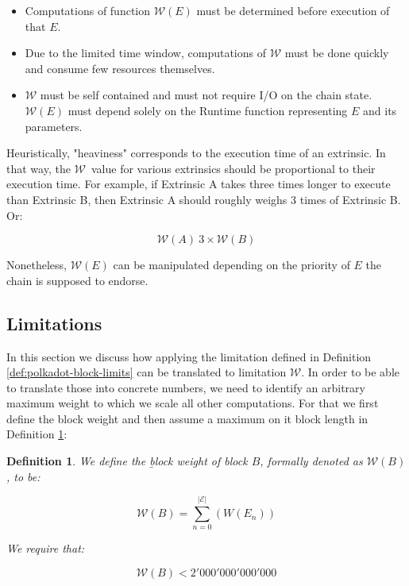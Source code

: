 \documentclass[11pt,a4paper]{article}
\newtheorem{definition}{Definition}
\newcommand{\TWF}{\ensuremath{\mathcal{W}}}
\begin{document}
\begin{itemize}

\item Computations of function $\mathcal{W}(E)$  must be determined before
execution of that $E$.

\item Due to the limited time window, computations of $\TWF$ must be done
      quickly and consume few resources themselves.
\item $\TWF$ must be self contained and must not require I/O on the chain state.
$\TWF(E)$ must depend solely on the Runtime function representing $E$ and its
parameters.

\end{itemize}

Heuristically, "heaviness" corresponds to the execution time of an extrinsic. In
that way, the \TWF\ value for various extrinsics should be proportional to their
execution time. For example, if Extrinsic A takes three times longer to execute
than Extrinsic B, then Extrinsic A should roughly weighs 3 times of Extrinsic B.
Or:

\[
\TWF(A)~3\times \TWF(B)
\]

Nonetheless, $\TWF(E)$ can be manipulated depending on the priority of $E$ the
chain is supposed to endorse.

\subsection{Limitations}\label{sec:limitations}

In this section we discuss how applying the limitation defined in Definition
\ref{def:polkadot-block-limits} can be translated to limitation $\TWF$. In order
to be able to translate those into concrete numbers, we need to identify an
arbitrary maximum weight to which we scale all other computations. For that we
first define the block weight and then assume a maximum on it block length in
Definition \ref{def:block-weight}:

\begin{definition}
  \label{def:block-weight} We define the {\b block weight} of block $B$,
  formally denoted as  $\TWF(B)$, to be:

  \[
    \TWF(B) = \sum^{|\mathcal{E}|}_{n = 0} (W(E_n))
  \]

  We require that:

  \[
    \TWF(B) < 2'000'000'000'000
  \]
\end{definition}
\end{document}
